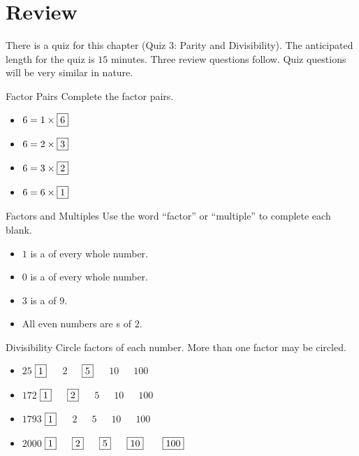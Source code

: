 \documentclass[a4paper,10pt]{report}
\begin{document}
\section{Review}

There is a quiz for this chapter (Quiz 3: Parity and Divisibility). The
anticipated length for the quiz is \(15\) minutes. Three review questions
follow. Quiz questions will be very similar in nature.

\begin{problem}{Factor Pairs}
 Complete the factor pairs.

 \begin{itemize}
  \item \(6 = 1 \times \Ans{6}\)
  \item \(6 = 2 \times \Ans{3}\)
  \item \(6 = 3 \times \Ans{2}\)
  \item \(6 = 6 \times \Ans{1}\)
 \end{itemize}
\end{problem}

\begin{problem}{Factors and Multiples}
 Use the word ``factor'' or ``multiple'' to complete each blank.

 \begin{itemize}
  \item \(1\) is a  of every whole number.
  \item \(0\) is a  of every whole number.
  \item \(3\) is a  of \(9\).
  \item All even numbers are s of \(2\).
 \end{itemize}
\end{problem}

\begin{problem}{Divisibility}
 Circle factors of each number. More than one factor may be circled.

 \begin{itemize}
  \item \(25\) \hfill \(\Ans{1}\)~~~\(2\)~~~\(\Ans{5}\)~~~\(10\)~~~\(100\)
  \item \(172\) \hfill \(\Ans{1}\)~~~\(\Ans{2}\)~~~\(5\)~~~\(10\)~~~\(100\)
  \item \(1793\) \hfill \(\Ans{1}\)~~~\(2\)~~~\(5\)~~~\(10\)~~~\(100\)
  \item \(2000\) \hfill \(\Ans{1}\)~~~\(\Ans{2}\)~~~\(\Ans{5}\)~~~\(\Ans{10}\)
  ~~~\(\Ans{100}\)
 \end{itemize}
\end{problem}
\end{document}
